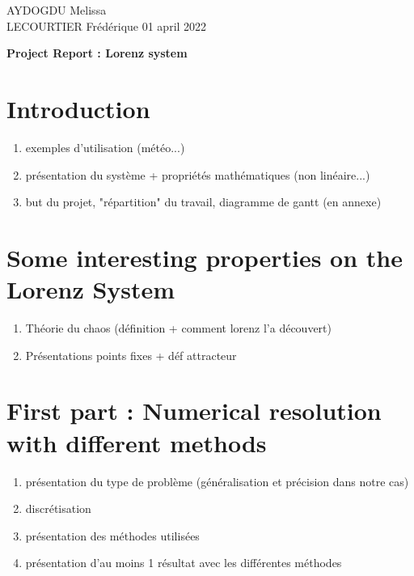 \documentclass[12pt]{article}
\begin{document}
	AYDOGDU Melissa \\
	LECOURTIER Frédérique \hfill 01 april 2022
	\begin{center}
		\Large\textbf{Project Report : Lorenz system}\\
	\end{center}
	
	\tableofcontents
	
	\section{Introduction}
	
	\begin{enumerate}[label=\textbullet]
		\item exemples d'utilisation (météo...)
		\item présentation du système + propriétés mathématiques (non linéaire...) 
		\item but du projet, "répartition" du travail, diagramme de gantt (en annexe)
	\end{enumerate}
	
	\section{Some interesting properties on the Lorenz System}
	
	\begin{enumerate}[label=\textbullet]
		\item Théorie du chaos (définition + comment lorenz l'a découvert)
		\item Présentations points fixes + déf attracteur
	\end{enumerate}
	
	\section{First part : Numerical resolution with different methods}
	
	\begin{enumerate}[label=\textbullet]
		\item présentation du type de problème (généralisation et précision dans notre cas)
		\item discrétisation
		\item présentation des méthodes utilisées
		\item présentation d'au moins 1 résultat avec les différentes méthodes
	\end{enumerate}
\end{document}
